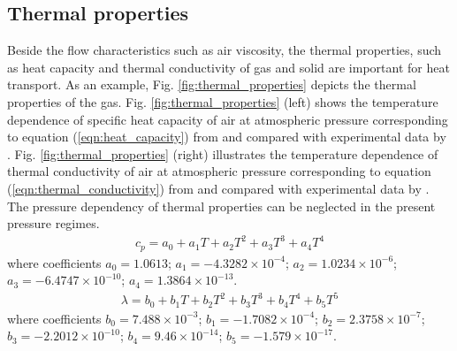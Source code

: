 \subsection{Thermal properties}\label{sec:thermal_properties}
\vspace{-0.3cm}Beside the flow characteristics such as air viscosity, the thermal properties, such as heat capacity and thermal conductivity of gas and solid are important for heat transport. As an example, Fig. \ref{fig:thermal_properties} depicts the thermal properties of the gas.
Fig. \ref{fig:thermal_properties} (left) shows the temperature dependence of specific heat capacity of air at atmospheric pressure corresponding to equation (\ref{eqn:heat_capacity}) from \cite{ZografosEtAl:1987} and compared with experimental data by \cite{VargaftikEtAl:1996}. Fig. \ref{fig:thermal_properties} (right) illustrates the temperature dependence of thermal conductivity of air at atmospheric pressure corresponding to equation (\ref{eqn:thermal_conductivity}) from \cite{ZografosEtAl:1987} and compared with experimental data by \cite{VargaftikEtAl:1996}. The pressure dependency of thermal properties can be neglected in the present pressure regimes.
\begin{align}
c_p=a_0+a_1 T+a_2 T^2+a_3 T^3+a_4 T^4
\label{eqn:heat_capacity}
\end{align}
where coefficients $a_0=1.0613$; $a_1=-4.3282 \times 10^{-4}$; $a_2=1.0234 \times 10^{-6}$; $a_3=-6.4747 \times 10^{-10}$; $a_4=1.3864 \times 10^{-13}$.
\begin{align}
\lambda=b_0+b_1 T+b_2 T^2+b_3 T^3+b_4 T^4+b_5 T^5
\label{eqn:thermal_conductivity}
\end{align}
where coefficients $b_0=7.488 \times 10^{-3}$; $b_1=-1.7082 \times 10^{-4}$; $b_2=2.3758 \times 10^{-7}$; $b_3=-2.2012 \times 10^{-10}$; $b_4=9.46 \times 10^{-14}$; $b_5=-1.579 \times 10^{-17}$. 
